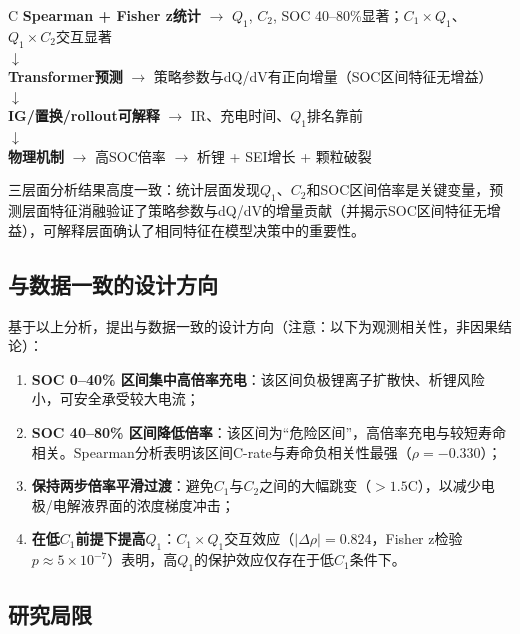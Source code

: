\documentclass[12pt,a4paper]{ctexart}
\begin{document}
\begin{center}
\begin{tabularx}{\textwidth}{C}
\toprule
\textbf{Spearman + Fisher z统计} $\to$ $Q_1$, $C_2$, SOC 40--80\%显著；$C_1\times Q_1$、$Q_1\times C_2$交互显著 \\
$\downarrow$ \\
\textbf{Transformer预测} $\to$ 策略参数与dQ/dV有正向增量（SOC区间特征无增益） \\
$\downarrow$ \\
\textbf{IG/置换/rollout可解释} $\to$ IR、充电时间、$Q_1$排名靠前 \\
$\downarrow$ \\
\textbf{物理机制} $\to$ 高SOC倍率 $\to$ 析锂 + SEI增长 + 颗粒破裂 \\
\bottomrule
\end{tabularx}
\end{center}

三层面分析结果高度一致：统计层面发现$Q_1$、$C_2$和SOC区间倍率是关键变量，预测层面特征消融验证了策略参数与dQ/dV的增量贡献（并揭示SOC区间特征无增益），可解释层面确认了相同特征在模型决策中的重要性。

\subsection{与数据一致的设计方向}

基于以上分析，提出与数据一致的设计方向（注意：以下为观测相关性，非因果结论）：

\begin{enumerate}[label=(\arabic*), leftmargin=*]
    \item \textbf{SOC 0--40\% 区间集中高倍率充电}：该区间负极锂离子扩散快、析锂风险小，可安全承受较大电流；
    \item \textbf{SOC 40--80\% 区间降低倍率}：该区间为``危险区间''，高倍率充电与较短寿命相关。Spearman分析表明该区间C-rate与寿命负相关性最强（$\rho=-0.330$）；
    \item \textbf{保持两步倍率平滑过渡}：避免$C_1$与$C_2$之间的大幅跳变（$>1.5$C），以减少电极/电解液界面的浓度梯度冲击；
    \item \textbf{在低$C_1$前提下提高$Q_1$}：$C_1 \times Q_1$交互效应（$|\Delta\rho|=0.824$，Fisher z检验$p\approx5\times10^{-7}$）表明，高$Q_1$的保护效应仅存在于低$C_1$条件下。
\end{enumerate}

\subsection{研究局限}
\end{document}

